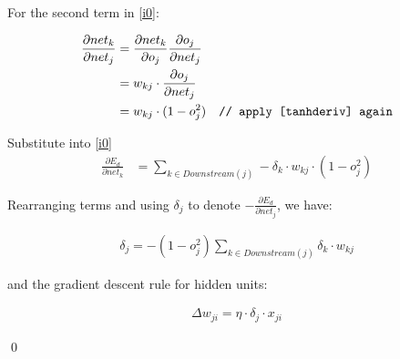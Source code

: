 \documentclass[preview]{standalone}
\begin{document}
For the second term in \cref{i0}:

\begin{align}
\label{i3}
\begin{split}
\frac{\partial net_{{k}}}{\partial net_{j}}
&= \frac{\partial net_{{k}}}{\partial o_j}\frac{\partial o_j}{\partial net_{j}}\\
&= w_{{kj}}\cdot\frac{\partial o_j}{\partial net_{j}}\\
&= w_{{kj}}\cdot(1-o_j^2)\quad\texttt{// apply \cref{tanhderiv} again}
\end{split}
\end{align}

Substitute into \cref{i0}
\begin{align}
\label{i4}
\frac{\partial E_d}{\partial net_{{k}}}
&= \sum_{{k\in Downstream(j)}}-\delta_{{k}}\cdot w_{{kj}} \cdot(1-o_j^2)
\end{align}

Rearranging terms and using $\delta_j$ to denote $-\frac{\partial E_d}{\partial
net_j}$, we have:

\begin{align}
    \delta_j = -(1-o_j^2)\sum_{{k\in Downstream(j)}}\delta_{{k}}\cdot w_{{kj}}
\end{align}

and the gradient descent rule for hidden units:

\begin{align}
    \Delta w_{ji} = \eta \cdot \delta_j \cdot x_{ji}
\end{align}

\qed
\end{document}
